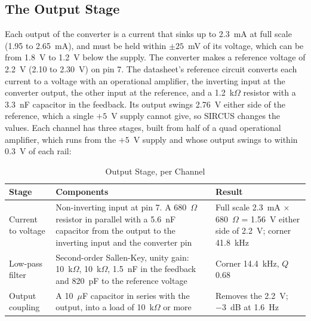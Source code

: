 \subsection{The Output Stage}
\label{sec:output-stage}

Each output of the converter is a current that sinks up to 2.3~mA at full scale (1.95 to 2.65~mA), and must be held
within $\pm 25$~mV of its voltage, which can be from 1.8~V to 1.2~V below the supply. The converter makes a reference
voltage of 2.2~V (2.10 to 2.30~V) on pin 7. The datasheet's reference circuit converts each current to a voltage with
an operational amplifier, the inverting input at the converter output, the other input at the reference, and a
1.2~k$\Omega$ resistor with a 3.3~nF capacitor in the feedback. Its output swings 2.76~V either side of the reference,
which a single $+5$~V supply cannot give, so SIRCUS changes the values. Each channel has three stages, built from half
of a quad operational amplifier, which runs from the $+5$~V supply and whose output swings to within 0.3~V of each
rail:

\begin{table}[H]
	\centering
	\small
	\begin{tabular}{lp{5.4cm}p{4.4cm}}
		\toprule
		\textbf{Stage}     & \textbf{Components}                                                                                                                                    & \textbf{Result}                                                                        \\
		\midrule
		Current to voltage & Non-inverting input at pin 7. A 680~$\Omega$ resistor in parallel with a 5.6~nF capacitor from the output to the inverting input and the converter pin & Full scale 2.3~mA $\times$ 680~$\Omega$ = 1.56~V either side of 2.2~V; corner 41.8~kHz \\
		Low-pass filter    & Second-order Sallen-Key, unity gain: 10~k$\Omega$, 10~k$\Omega$, 1.5~nF in the feedback and 820~pF to the reference voltage                            & Corner 14.4~kHz, $Q$ 0.68                                                              \\
		Output coupling    & A 10~$\mu$F capacitor in series with the output, into a load of 10~k$\Omega$ or more                                                                   & Removes the 2.2~V; $-3$~dB at 1.6~Hz                                                   \\
		\bottomrule
	\end{tabular}
	\caption{Output Stage, per Channel}
	\label{tab:output-stage}
\end{table}

